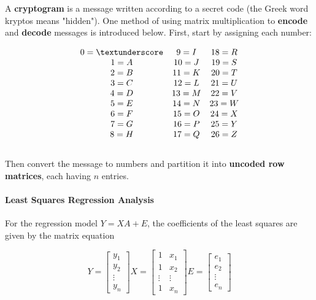 \documentclass{report}
\begin{document}
A \textbf{cryptogram} is a message written according to a secret code (the Greek word kryptos means "hidden"). One method of using matrix multiplication to \textbf{encode} and \textbf{decode} messages is introduced below. First, start by assigning each number:

$$
\begin{matrix}
    {0 = \textunderscore} & {9 = I} & {18 = R} \\
    {1 = A} & {10 = J} & {19 = S} \\
    {2 = B} & {11 = K} & {20 = T} \\
    {3 = C} & {12 = L} & {21 = U} \\
    {4 = D} & {13 = M} & {22 = V} \\
    {5 = E} & {14 = N} & {23 = W} \\
    {6 = F} & {15 = O} & {24 = X} \\
    {7 = G} & {16 = P} & {25 = Y} \\
    {8 = H} & {17 = Q} & {26 = Z} \\
\end{matrix}
$$\\

Then convert the message to numbers and partition it into \textbf{uncoded row matrices}, each having $n$ entries.

\paragraph{Least Squares Regression Analysis} For the regression model $Y = XA + E$, the coefficients of the least squares are given by the matrix equation


\[
Y
=
\begin{bmatrix}
    y_1\\
    y_2\\
    \vdots \\
    y_n
\end{bmatrix}
X
=
\begin{bmatrix}
    1 & x_1 \\
    1 & x_2 \\
    \vdots & \vdots \\
    1 & x_n
\end{bmatrix}
E
=
\begin{bmatrix}
    e_1 \\
    e_2 \\ 
    \vdots \\
    e_n
\end{bmatrix}
\]
\end{document}
